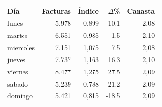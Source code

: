 \begin{tabular}{lrrrr}
\toprule
\textbf{Día} & \textbf{Facturas} & \textbf{Índice} & \textbf{$\Delta$\%} & \textbf{Canasta} \\
\midrule
lunes & 5.978 & 0,899 & -10,1 & 2,08 \\
martes & 6.551 & 0,985 & -1,5 & 2,10 \\
miercoles & 7.151 & 1,075 & 7,5 & 2,08 \\
jueves & 7.737 & 1,163 & 16,3 & 2,10 \\
viernes & 8.477 & 1,275 & 27,5 & 2,09 \\
sabado & 5.239 & 0,788 & -21,2 & 2,09 \\
domingo & 5.421 & 0,815 & -18,5 & 2,09 \\
\bottomrule
\end{tabular}
